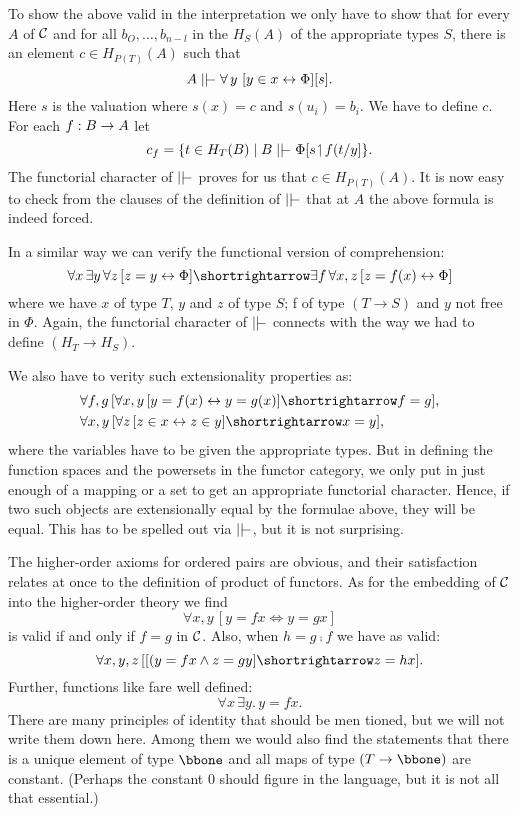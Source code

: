 To show the above valid in the interpretation we only have to show that for every $A$ of
$\mathcal C$ and for all $b_O, \dots ,b_{n-l}$ in the $H_S(A)$ of the appropriate types $S$, there
is an element $c \in H_{P(T)}(A)$ such that
$$
A \mm \forall\, y \,\, [y \in x \iff \Phi][s] .
$$
%
Here $s$ is the valuation where $s(x) = c$ and $s(u_i) = b_i$. We have to define $c$. For
each $f: B \rightarrow A$ let
$$
c_f = \{t \in H_T(B) \mid B \mm \Phi [s \res f(t/y] \} .
$$
%
The functorial character of $\mm$ proves for us that $c \in H_{P(T)}(A)$. It is now easy
to check from the clauses of the definition of $\mm$ that at $A$ the above formula is
indeed forced.

In a similar way we can verify the functional version of comprehension:
$$
\forall x \, \exists y \, \forall z \, [ z = y \iff \Phi] \imp \exists f\, \forall x,z\, [z = f(x) \iff \Phi ]
$$
%
where we have $x$ of type $T$, $y$ and $z$ of type $S$; f of type $(T\to S)$ and $y$ not
free in $\Phi$. Again, the functorial character of $\mm$ connects with the way we had to
define $(H_T \to H_S)$.

We also have to verity such extensionality properties as:
\begin{align*}
&\forall f,g \, [\forall x,y \, [ y = f(x) \iff y = g(x) ] \imp f = g],\\
&\forall x,y \, [\forall z \, [ z \in x \iff z \in y ] \imp x = y],
\end{align*}
%
where the variables have to be given the appropriate types. But in defining the function
spaces and the powersets in the functor category, we only put in just enough of a mapping
or a set to get an appropriate functorial character. Hence, if two such objects are
extensionally equal by the formulae above, they will be equal. This has to be spelled out
via $\mm$, but it is not surprising.

The higher-order axioms for ordered pairs are obvious, and their satisfaction relates at
once to the definition of product of functors. As for the embedding of $\mathcal C$ into the
higher-order theory we find
$$
\forall x,y \, [y = f x \iff y = gx]
$$
is valid if and only if $f = g$ in $\mathcal C$. Also, when $h = g \comp f$ we have as valid:
$$
\forall x,y,z\, [[(y = fx \land z = gy] \imp z = hx].
$$
Further, functions like fare well defined:
$$
\forall x\, \exists y.\, y = fx .
$$
There are many principles of identity that should be men tioned, but we will not write
them down here. Among them we would also find the statements that there is a unique
element of type $\bbone$ and all maps of type $(T\to \bbone )$ are constant. (Perhaps the
constant 0 should figure in the language, but it is not all that essential.)

